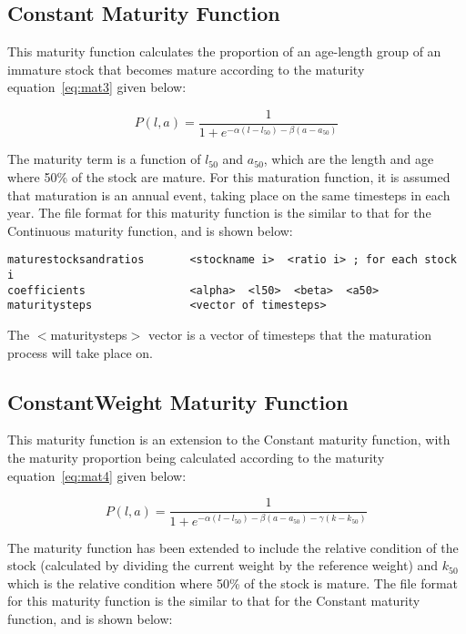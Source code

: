 \documentclass[10pt,twoside]{book}
\begin{document}
\subsection{Constant Maturity Function}
This maturity function calculates the proportion of an age-length group of an immature stock that becomes mature according to the maturity equation~\ref{eq:mat3} given below:

\begin{equation}\label{eq:mat3}
P(l, a) = \frac{1}{ 1 + e^{-\alpha(l - l_{50}) -\beta(a - a_{50})}}
\end{equation}

The maturity term is a function of $l_{50}$ and $a_{50}$, which are the length and age where 50\% of the stock are mature.  For this maturation function, it is assumed that maturation is an annual event, taking place on the same timesteps in each year.  The file format for this maturity function is the similar to that for the Continuous maturity function, and is shown below:

{\small\begin{verbatim}
maturestocksandratios       <stockname i>  <ratio i> ; for each stock i
coefficients                <alpha>  <l50>  <beta>  <a50>
maturitysteps               <vector of timesteps>
\end{verbatim}}

The $<$maturitysteps$>$ vector is a vector of timesteps that the maturation process will take place on.

\subsection{ConstantWeight Maturity Function}
This maturity function is an extension to the Constant maturity function, with the maturity proportion being calculated according to the maturity equation~\ref{eq:mat4} given below:

\begin{equation}\label{eq:mat4}
P(l, a) = \frac{1}{ 1 + e^{-\alpha(l - l_{50}) -\beta(a - a_{50}) -\gamma(k - k_{50})}}
\end{equation}

The maturity function has been extended to include the relative condition of the stock (calculated by dividing the current weight by the reference weight) and $k_{50}$ which is the relative condition where 50\% of the stock is mature.  The file format for this maturity function is the similar to that for the Constant maturity function, and is shown below:
\end{document}
